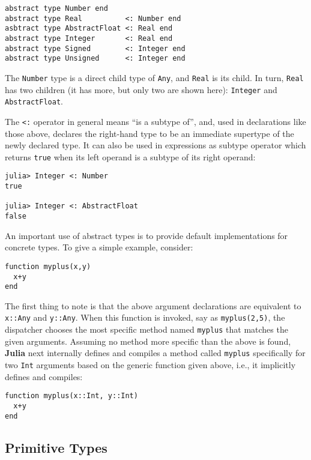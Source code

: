 \documentclass[
]{article}
\begin{document}
\begin{verbatim}
abstract type Number end
abstract type Real          <: Number end
asbtract type AbstractFloat <: Real end
abstract type Integer       <: Real end
abstract type Signed        <: Integer end
abstract type Unsigned      <: Integer end
\end{verbatim}

The \texttt{Number} type is a direct child type of \texttt{Any}, and
\texttt{Real} is its child. In turn, \texttt{Real} has two children (it
has more, but only two are shown here): \texttt{Integer} and
\texttt{AbstractFloat}.

The \texttt{\textless{}:} operator in general means ``is a subtype of'',
and, used in declarations like those above, declares the right-hand type
to be an immediate supertype of the newly declared type. It can also be
used in expressions as subtype operator which returns \texttt{true} when
its left operand is a subtype of its right operand:

\begin{verbatim}
julia> Integer <: Number
true

julia> Integer <: AbstractFloat
false
\end{verbatim}

An important use of abstract types is to provide default implementations
for concrete types. To give a simple example, consider:

\begin{verbatim}
function myplus(x,y)
  x+y
end
\end{verbatim}

The first thing to note is that the above argument declarations are
equivalent to \texttt{x::Any} and \texttt{y::Any}. When this function is
invoked, say as \texttt{myplus(2,5)}, the dispatcher chooses the most
specific method named \texttt{myplus} that matches the given arguments.
Assuming no method more specific than the above is found, \textbf{Julia}
next internally defines and compiles a method called \texttt{myplus}
specifically for two \texttt{Int} arguments based on the generic
function given above, i.e., it implicitly defines and compiles:

\begin{verbatim}
function myplus(x::Int, y::Int)
  x+y
end
\end{verbatim}

\hypertarget{primitive-types}{%
\subsection{Primitive Types}\label{primitive-types}}
\end{document}
